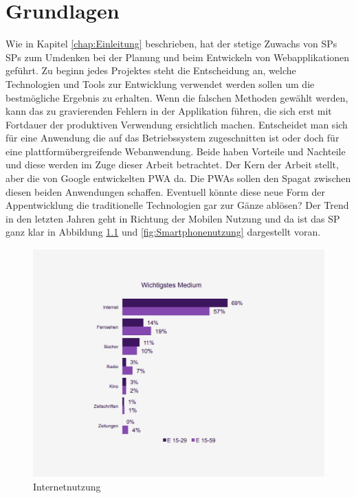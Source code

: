 \chapter{Grundlagen}
\thispagestyle{standard}
\pagestyle{standard}
\renewcommand{\footrulewidth}{0.4pt}

Wie in Kapitel \ref{chap:Einleitung} beschrieben, hat der stetige Zuwachs von \acl{SP}s \acs{SP}s \cite{Geraetenutzung} zum Umdenken bei der Planung und beim Entwickeln von Webapplikationen geführt.
Zu beginn jedes Projektes steht die Entscheidung an, welche Technologien und Tools zur Entwicklung verwendet werden sollen um die bestmögliche Ergebnis zu erhalten.
Wenn die falschen Methoden gewählt werden, kann das zu gravierenden Fehlern in der Applikation führen, die sich erst mit Fortdauer der produktiven Verwendung ersichtlich machen.
Entscheidet man sich für eine Anwendung die auf das Betriebssystem zugeschnitten ist oder doch für eine plattformübergreifende Webanwendung. Beide haben Vorteile und Nachteile und diese werden im Zuge dieser Arbeit betrachtet. Der Kern der Arbeit stellt, aber die von Google entwickelten \acs{PWA} \cite{PWA} da. Die \acs{PWA}s sollen den Spagat zwischen diesen beiden Anwendungen schaffen. Eventuell könnte diese neue Form der Appentwicklung die traditionelle Technologien gar zur Gänze ablösen?
Der Trend in den letzten Jahren geht in Richtung der Mobilen Nutzung und da ist das \acl{SP} ganz klar in Abbildung \ref{fig:Internetnutzung} und \ref{fig:Smartphonenutzung} dargestellt voran.  

\begin{figure}[h]
	\centering
	\includegraphics[width=14cm]{BilderAllgemein/Internetnutzung}\medskip
	\caption{Internetnutzung \cite{Geraetenutzung}}
	\label{fig:Internetnutzung}
\end{figure}

